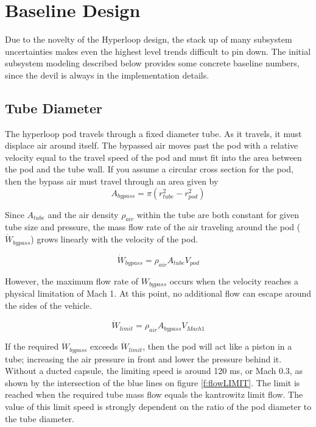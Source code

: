 \documentclass[heading.tex]{subfiles}
\begin{document}
\section{Baseline Design}

Due to the novelty of the Hyperloop design, the stack up of many subsystem uncertainties makes even the highest level trends difficult to pin down.
The initial subsystem modeling described below provides some concrete baseline numbers, since the devil is always in the implementation details. 

\subsection{Tube Diameter}
The hyperloop pod travels through a fixed diameter tube. As it travels, it must displace air around itself. The bypassed air moves past the
pod with a relative velocity equal to the travel speed of the pod and must fit into the area between the pod and the tube wall. If you
assume a circular cross section for the pod, then the bypass air must travel through an area given by
\begin{equation*}
A_{bypass} = \pi(r_{tube}^2-r_{pod}^2)
\end{equation*}

Since $A_{tube}$ and the air density $\rho_{air}$ within the tube are both constant for given tube size and pressure, the mass flow rate of the air
traveling around the pod ($\dot{W}_{bypass}$) grows linearly with the velocity of the pod.

\begin{equation*}
\dot{W}_{bypass} = \rho_{air} A_{tube} V_{pod}
\end{equation*}

However, the maximum flow rate of ${W}_{bypass}$ occurs when the velocity reaches a physical limitation of Mach 1. At this point, no additional
flow can escape around the sides of the vehicle.

\begin{equation*}
\dot{W}_{limit} = \rho_{air} A_{bypass} V_{Mach 1}
\end{equation*}


If the required $\dot{W}_{bypass}$ exceeds $\dot{W}_{limit}$, then the pod will act like a piston in a tube; increasing the air pressure in front
and lower the pressure behind it. Without a ducted capsule, the limiting speed is around 120 ms, or Mach 0.3, as shown by the intersection of the blue
lines on figure \ref{f:flowLIMIT}. The limit is reached when the required tube mass flow equals the kantrowitz limit flow. The value of this limit speed
is strongly dependent on the ratio of the pod diameter to the tube diameter.
\end{document}

